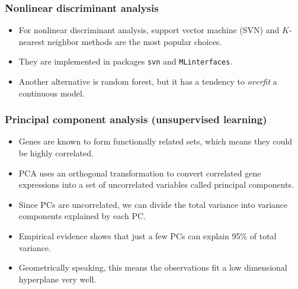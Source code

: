 \begin{frame}
  \frametitle{Nonlinear discriminant analysis}
  \begin{itemize}
  \item For \alert{nonlinear} discriminant analysis, support vector
    machine (SVN) and $K$-nearest neighbor methods are the most
    popular choices.
  \item They are implemented in packages \texttt{svn} and \texttt{MLinterfaces}.
  \item Another alternative is random forest, but it has a tendency to
    \textit{overfit} a continuous model.
  \end{itemize}
\end{frame}


\begin{frame}
  \frametitle{Principal component analysis (unsupervised learning)}
  \begin{itemize}
  \item Genes are known to form functionally related sets, which means
    they could be highly correlated.
  \item PCA uses an orthogonal transformation to convert correlated
    gene expressions into a set of \alert{uncorrelated} variables
    called principal components.
  \item Since PCs are uncorrelated, we can divide the total variance
    into variance components explained by each PC.
  \item Empirical evidence shows that just a few PCs can explain 95\%
    of total variance.
  \item Geometrically speaking, this means the observations fit a low
    dimensional hyperplane very well.
  \end{itemize}
\end{frame}

